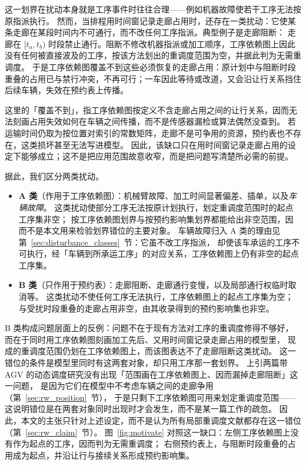 \documentclass[manuscript,screen,review]{acmart}
\begin{document}
这一划界在扰动本身就是工序事件时往往合理——例如机器故障使若干工序无法按原指派执行。
然而，当排程用时间窗记录走廊占用时，还存在一类扰动：它使某条走廊在某段时间内不可通行，而不改任何工序指派。典型例子是走廊阻断：
走廊在 \([t_a,t_b)\) 时段禁止通行。阻断不修改机器指派或加工顺序，工序依赖图上因此没有任何被直接波及的工序，按该方法划出的重调度范围为空，并据此判为无需重调度。
于是工序依赖图覆盖不到这些必须恢复的走廊占用：原计划中与阻断时段重叠的占用已与禁行冲突，不再可行；一车因此等待或改道，又会沿让行关系挡住后续车辆，失效在预约表上传播。

这里的「覆盖不到」，指工序依赖图按定义不含走廊占用之间的让行关系，因而无法刻画占用失效如何在车辆之间传播，而不是传感器漏检或算法偶然没查到。
若运输时间仍取为按位置对索引的常数矩阵，走廊不是可争用的资源，预约表也不存在，这类损坏甚至无法写进模型。
因此，该缺口只在用时间窗记录走廊占用的设定下能够成立；这不是把应用范围故意收窄，而是把问题写清楚所必需的前提。

据此，我们区分两类扰动。
\begin{itemize}[leftmargin=1.5em,itemsep=0.25em]
\item \textbf{A 类}（作用于工序依赖图）：机械臂故障、加工时间显著偏差、插单，以及\emph{车辆故障}。
这类扰动使部分工序无法按原计划执行，划定重调度范围时的起点工序集非空；
按工序依赖图划界与按预约影响集划界都能给出非空范围，因而不是本文用来检验划界错位的主要对象。
车辆故障归入 A 类的理由见第~\ref{sec:disturbance_classes}~节：它虽不改工序指派，
却使该车承运的工序不可执行，经「车辆到所承运工序」的对应关系，工序依赖图上仍有非空的起点工序集。
\item \textbf{B 类}（只作用于预约表）：走廊阻断、走廊通行变慢，以及局部通行权临时取消等。
这类扰动不使任何工序无法执行，工序依赖图上的起点工序集为空；
与受扰时段重叠的走廊占用非空，由其收录得到的预约影响集也非空。
\end{itemize}
B 类构成问题层面上的反例：问题不在于现有方法对工序的重调度修得不够好，
而在于同时用工序依赖图刻画加工先后、又用时间窗记录走廊占用的模型里，
现成的重调度范围仍划在工序依赖图上，而该图表达不了走廊阻断这类扰动。
这一错位的条件是模型里同时有这两套对象，却只用工序那一套划界。
上引两篇带 AGV 的动态调度研究没有出现「范围画在工序依赖图上、因而漏掉走廊阻断」这一问题，
是因为它们在模型中不考虑车辆之间的走廊争用（第~\ref{sec:rw_position}~节），
于是只剩下工序依赖图可用来划定重调度范围——
这说明错位是在两套对象同时出现时才会发生，而不是某一篇工作的疏忽。
因此，本文的主张只针对上述设定，而不是认为所有局部重调度文献都存在这一错位
（第~\ref{sec:rw_claim}~节）。
图~\ref{fig:motivate} 对照这一缺口：左侧工序依赖图上没有作为起点的工序，因而判为无需重调度；
右侧预约表上，与阻断时段重叠的占用成为起点，并沿让行与接续关系形成预约影响集。
\end{document}
